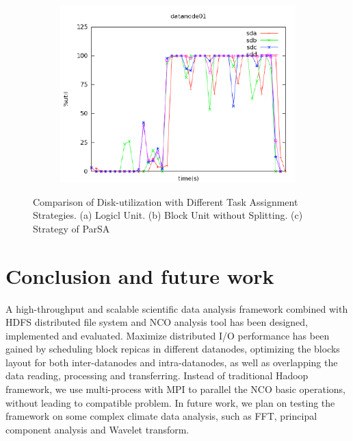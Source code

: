 \documentclass[preprint,12pt]{elsarticle}
\begin{document}
\begin{figure}[tbh]
\begin{subfigure}{0.5\textwidth}
        \includegraphics[width=\textwidth]{figure10c}%
        \caption{}
        \label{figure10c}
    \end{subfigure}
    \caption{Comparison of Disk-utilization with Different Task Assignment Strategies. (a) Logicl Unit. (b) Block Unit without Splitting. 
             (c) Strategy of ParSA}
    \label{figure10}
\end{figure}

\section{Conclusion and future work}
A high-throughput and scalable scientific data analysis framework combined with HDFS distributed file system and NCO analysis tool has been
designed, implemented and evaluated. Maximize distributed I/O performance has been gained by scheduling block repicas in different datanodes, 
optimizing the blocks layout for both inter-datanodes and intra-datanodes,  as well as overlapping the data reading, processing and 
transferring. Instead of traditional Hadoop framework, we use multi-process with MPI to parallel the NCO basic operations, without leading to 
compatible problem. In future work, we plan on testing the framework on some complex climate data analysis, such as FFT, principal component 
analysis and Wavelet transform.

	

\end{document}
